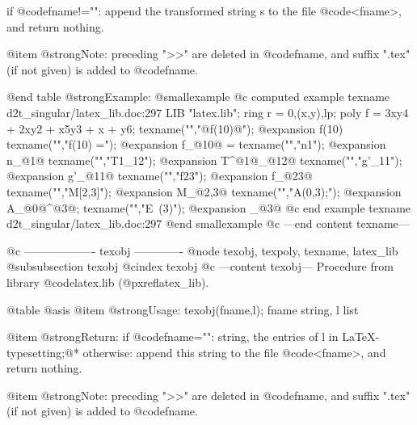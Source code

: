 {{if @code{fname!=""}: append the transformed string s to the file
@code{<fname>}, and return nothing.

@item @strong{Note:}
preceding ">>" are deleted in @code{fname}, and suffix ".tex"
(if not given) is added to @code{fname}.

@end table
@strong{Example:}
@smallexample
@c computed example texname d2t_singular/latex_lib.doc:297 
LIB "latex.lib";
ring r = 0,(x,y),lp;
poly f = 3xy4 + 2xy2 + x5y3 + x + y6;
texname("","@{f(10)@}");
@expansion{} f(10)
texname("","f(10) =");
@expansion{} f_@{10@} =
texname("","n1");
@expansion{} n_@{1@}
texname("","T1_12");
@expansion{} T^@{1@}_@{12@}
texname("","g'_11");
@expansion{} g'_@{11@}
texname("","f23");
@expansion{} f_@{23@}
texname("","M[2,3]");
@expansion{} M_@{2,3@}
texname("","A(0,3);");
@expansion{} A_@{0@}^@{3@};
texname("","E~(3)");
@expansion{} _@{3@}
@c end example texname d2t_singular/latex_lib.doc:297
@end smallexample
@c ---end content texname---

@c ------------------- texobj -------------
@node texobj, texpoly, texname, latex_lib
@subsubsection texobj
@cindex texobj
@c ---content texobj---
Procedure from library @code{latex.lib} (@pxref{latex_lib}).

@table @asis
@item @strong{Usage:}
texobj(fname,l); fname string, l list

@item @strong{Return:}
if @code{fname=""}: string, the entries of l in LaTeX-typesetting;@*
otherwise: append this string to the file @code{<fname>}, and
return nothing.

@item @strong{Note:}
preceding ">>" are deleted in @code{fname}, and suffix ".tex"
(if not given) is added to @code{fname}.

}}
